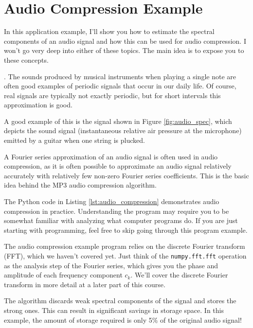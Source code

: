 \section{Audio Compression Example}
In this application example, I'll show you how to estimate the
spectral components of an audio signal and how this can be used for
audio compression. I won't go very deep into either of these
topics. The main idea is to expose you to these concepts.

.  The sounds produced by musical
instruments when playing a single note are often good examples of
periodic signals that occur in our daily life. Of course, real signals
are typically not exactly periodic, but for short intervals this
approximation is good.

A good example of this is the signal shown in
Figure \ref{fig:audio_spec}, which depicts the sound signal (instantaneous
relative air pressure at the microphone) emitted by a guitar when one
string is plucked.

A Fourier series approximation of an audio signal is often used in
audio compression, as it is often possible to approximate an audio
signal relatively accurately with relatively few non-zero Fourier
series coefficients. This is the basic idea behind the MP3 audio
compression algorithm.

The Python code in Listing \ref{lst:audio_compression} demonstrates
audio compression in practice. Understanding the program may require
you to be somewhat familiar with analyzing what computer programs
do. If you are just starting with programming, feel free to skip going
through this program example.

The audio compression example program relies on the discrete Fourier
transform (FFT), which we haven't covered yet. Just think of
the \verb|numpy.fft.fft| operation as the analysis step of the Fourier
series, which gives you the phase and amplitude of each frequency
component $c_k$. We'll cover the discrete Fourier transform in more
detail at a later part of this course.



The algorithm discards weak spectral components of the signal and
stores the strong ones. This can result in significant savings in
storage space. In this example, the amount of storage required is only
5\% of the original audio signal!

